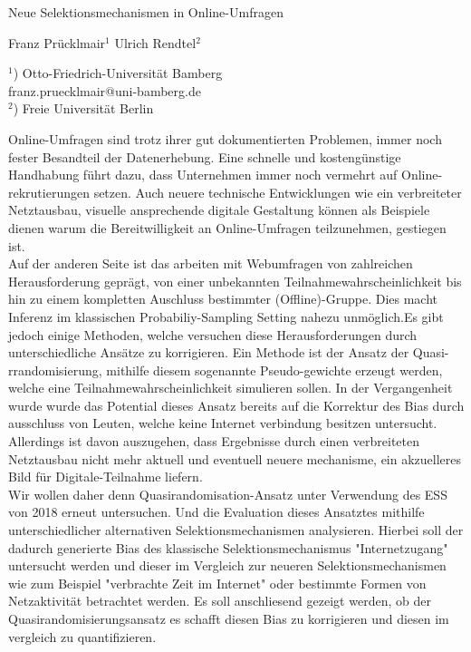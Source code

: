 \documentclass[a4paper]{article}
\begin{document}

\Large
 \begin{center}
Neue Selektionsmechanismen in Online-Umfragen\\ 

\hspace{10pt}

\large
Franz Prücklmair$^1$ Ulrich Rendtel$^2$ \\

\hspace{10pt}

\small  
$^1$) Otto-Friedrich-Universität Bamberg\\
franz.pruecklmair@uni-bamberg.de\\
$^2$) Freie Universität Berlin

\end{center}

\hspace{10pt}

\normalsize

Online-Umfragen sind trotz ihrer gut dokumentierten Problemen, immer noch fester Besandteil der Datenerhebung. Eine schnelle und kostengünstige Handhabung führt dazu, dass Unternehmen immer noch vermehrt auf Online-rekrutierungen setzen. Auch neuere technische Entwicklungen wie ein verbreiteter Netztausbau, visuelle ansprechende digitale Gestaltung können als Beispiele dienen warum die Bereitwilligkeit an Online-Umfragen teilzunehmen, gestiegen ist.
\\


Auf der anderen Seite ist das arbeiten mit Webumfragen von zahlreichen Herausforderung geprägt, von einer unbekannten Teilnahmewahrscheinlichkeit bis hin zu einem kompletten Auschluss bestimmter (Offline)-Gruppe. Dies macht Inferenz im klassischen Probabiliy-Sampling Setting nahezu unmöglich.Es gibt jedoch einige Methoden, welche versuchen diese Herausforderungen durch unterschiedliche Ansätze zu korrigieren. Ein Methode  ist der Ansatz der Quasi-rrandomisierung, mithilfe diesem sogenannte Pseudo-gewichte erzeugt werden, welche eine Teilnahmewahrscheinlichkeit simulieren sollen. In der Vergangenheit wurde wurde das Potential dieses Ansatz bereits auf die Korrektur des Bias durch ausschluss von Leuten, welche keine Internet verbindung besitzen untersucht. Allerdings ist davon auszugehen, dass Ergebnisse durch einen verbreiteten Netztausbau nicht mehr aktuell  und eventuell neuere mechanisme, ein akzuelleres Bild für Digitale-Teilnahme liefern.
\\

Wir wollen daher denn Quasirandomisation-Ansatz unter Verwendung des ESS von 2018 erneut untersuchen. Und die Evaluation dieses Ansatztes mithilfe unterschiedlicher alternativen Selektionsmechanismen analysieren. Hierbei soll der dadurch generierte Bias des klassische Selektionsmechanismus "Internetzugang" untersucht werden und dieser im Vergleich zur neueren Selektionsmechanismen wie zum Beispiel "verbrachte Zeit im Internet" oder bestimmte Formen von Netzaktivität betrachtet werden. Es soll anschliesend gezeigt werden, ob der Quasirandomisierungsansatz es schafft diesen Bias zu korrigieren und diesen im vergleich zu quantifizieren. 
\end{document}
